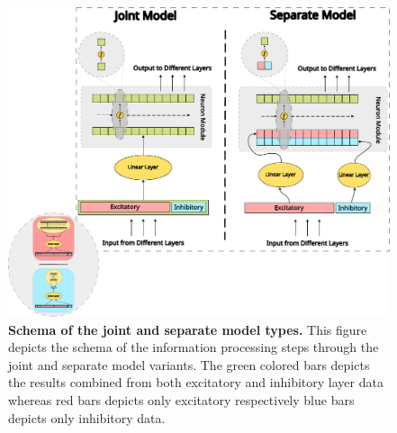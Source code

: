 \begin{figure}
    \centering
    \includegraphics[width=\linewidth]{img/joint_separate_schema.pdf}
    \caption{\textbf{Schema of the joint and separate model types.} This figure depicts the schema of the information processing steps through the joint and separate model variants. The green colored bars depicts the results combined from both excitatory and inhibitory layer data whereas red bars depicts only excitatory respectively blue bars depicts only inhibitory data.}
    \label{fig:joint_sep_modules}
\end{figure}

